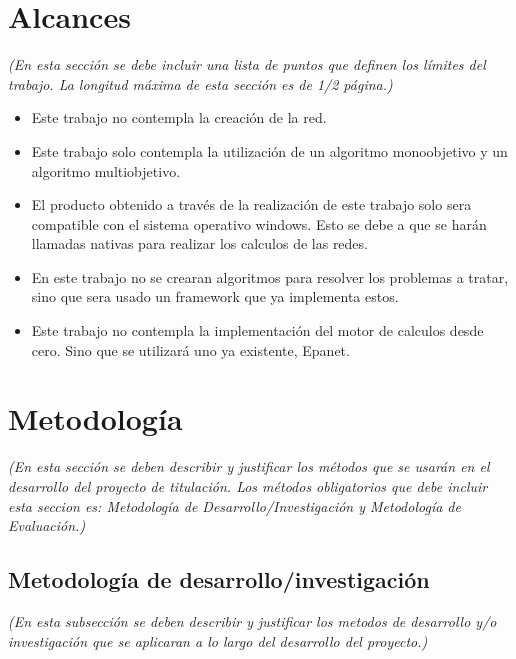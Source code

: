 \documentclass[11pt,letterpaper]{article}
\begin{document}
\section{Alcances}
\emph{(En esta sección se debe incluir una lista de puntos que definen los límites del trabajo. La longitud máxima de esta sección es de 1/2 página.)}
\begin{itemize}
\item Este trabajo no contempla la creación de la red.
\item Este trabajo solo contempla la utilización de un algoritmo monoobjetivo y un algoritmo multiobjetivo.
\item El producto obtenido a través de la realización de este trabajo solo sera compatible con el sistema operativo windows. Esto se debe a que se harán llamadas nativas para realizar los calculos de las redes.
\item En este trabajo no se crearan algoritmos para resolver los problemas a tratar, sino que sera usado un framework que ya implementa estos.
\item Este trabajo no contempla la implementación del motor de calculos desde cero. Sino que se utilizará uno ya existente, Epanet. 

\end{itemize}



\section{Metodología}
\emph{(En esta sección se deben describir y justificar los métodos que se usarán en el desarrollo del proyecto de titulación. Los métodos obligatorios que debe incluir esta seccion es: Metodología de Desarrollo/Investigación y Metodología de Evaluación.)}

\subsection{Metodología de desarrollo/investigación}

\emph{(En esta subsección se deben describir y justificar los metodos de desarrollo y/o investigación que se aplicaran a lo largo del desarrollo del proyecto.)}
\end{document}
